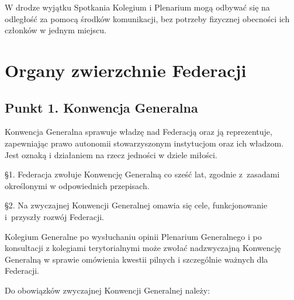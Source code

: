 

 W drodze wyjątku Spotkania Kolegium i Plenarium mogą odbywać się na odległość za pomocą środków komunikacji, bez potrzeby fizycznej obecności ich członków w jednym miejscu.
 
\chapter{Organy zwierzchnie Federacji}
 
\section{Punkt 1. Konwencja Generalna}




 Konwencja Generalna sprawuje władzę nad Federacją oraz ją reprezentuje, zapewniając prawo autonomii stowarzyszonym instytucjom oraz ich władzom. Jest oznaką i działaniem na rzecz jedności w dziele miłości.
 


 \S{}1. Federacja zwołuje Konwencję Generalną co sześć lat, zgodnie \mbox{z zasadami} określonymi w odpowiednich przepisach.




\S{}2. Na zwyczajnej  Konwencji Generalnej omawia się cele, funkcjonowanie \mbox{i przyszły} rozwój Federacji.






 Kolegium Generalne po wysłuchaniu opinii Plenarium Generalnego i po konsultacji z kolegiami terytorialnymi może zwołać nadzwyczajną Konwencję Generalną w sprawie omówienia kwestii pilnych i szczególnie ważnych dla Federacji.




 Do obowiązków zwyczajnej Konwencji Generalnej należy:


